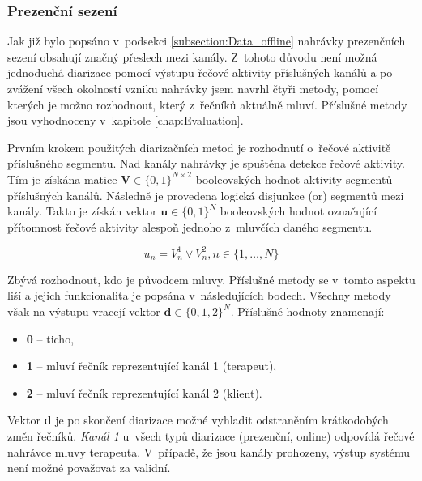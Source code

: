 \subsubsection{Prezenční sezení}
Jak již bylo popsáno v~podsekci \ref{subsection:Data_offline} nahrávky prezenčních sezení obsahují značný přeslech mezi kanály. Z~tohoto důvodu není možná jednoduchá diarizace pomocí výstupu řečové aktivity příslušných kanálů a po zvážení všech okolností vzniku nahrávky jsem navrhl čtyři metody, pomocí kterých je možno rozhodnout, který z~řečníků aktuálně mluví. Příslušné metody jsou vyhodnoceny v~kapitole \ref{chap:Evaluation}.

Prvním krokem použitých diarizačních metod je rozhodnutí o~řečové aktivitě příslušného segmentu. Nad kanály nahrávky je spuštěna detekce řečové aktivity. Tím je získána matice $\mathbf{V} \in \{0,1\}^{N \times 2}$ booleovských hodnot aktivity segmentů příslušných kanálů. Následně je provedena logická disjunkce (or) segmentů mezi kanály. Takto je získán vektor $\mathbf{u} \in\{0,1\}^{N}$ booleovských hodnot označující přítomnost řečové aktivity alespoň jednoho z~mluvčích daného segmentu.

\begin{equation}
\label{eqn:VAD}
    u_{n} = V_{n}^{1} \lor V^{2}_{n}, n \in \{1,\dots, N\}
\end{equation}

Zbývá rozhodnout, kdo je původcem mluvy. Příslušné metody se v~tomto aspektu liší a jejich funkcionalita je popsána v~následujících bodech. Všechny metody však na výstupu vracejí vektor $\mathbf{d} \in \{0,1,2\}^{N}$. Příslušné hodnoty znamenají: 
\begin{itemize}
    \item \textbf{0} -- ticho,
    \item \textbf{1} -- mluví řečník reprezentující kanál 1 (terapeut),
    \item \textbf{2} -- mluví řečník reprezentující kanál 2 (klient).
\end{itemize}

Vektor \textbf{d} je po skončení diarizace možné vyhladit odstraněním krátkodobých změn řečníků. \textit{Kanál 1} u~všech typů diarizace (prezenční, online) odpovídá řečové nahrávce mluvy terapeuta. V~případě, že jsou kanály prohozeny, výstup systému není možné považovat za validní.

